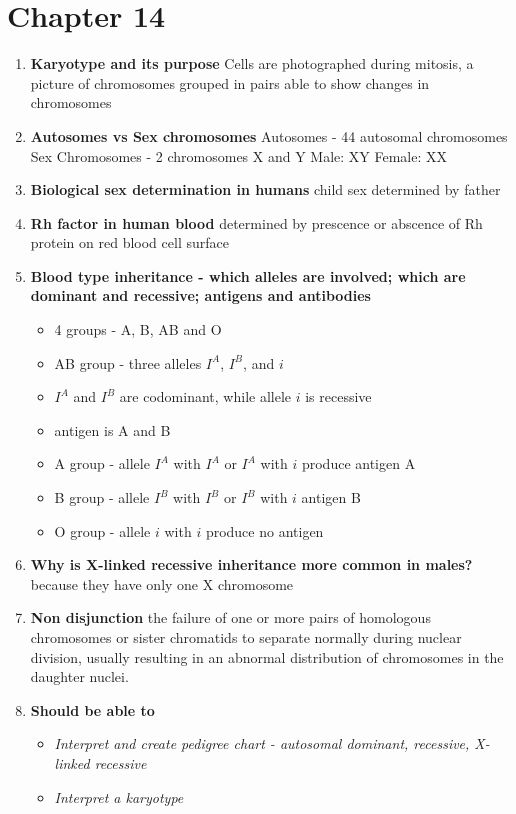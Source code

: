 \documentclass[9pt]{article}
\begin{document}
\section*{Chapter 14}
\begin{enumerate}
  \item {\bf Karyotype and its purpose}  Cells are photographed during mitosis, a picture of chromosomes grouped in pairs able to show changes in chromosomes
  \item {\bf Autosomes vs Sex chromosomes}
  Autosomes - 44 autosomal chromosomes
  Sex Chromosomes - 2 chromosomes X and Y 
  Male: XY
  Female: XX
  \item {\bf Biological sex determination in humans} child sex determined by father 
  \item {\bf Rh factor in human blood}
  determined by prescence or abscence of Rh protein on red blood cell surface
  \item {\bf Blood type inheritance - which alleles are involved; which are dominant and recessive; antigens and antibodies}
  \begin{itemize}
  \item 4 groups - A, B, AB and O
  \item AB group - three alleles $I^A$, $I^B$, and $i$
  \item $I^A$ and $I^B$ are codominant, while allele $i$ is recessive
  \item antigen is A and B
  \item A group - allele $I^A$ with $I^A$ or $I^A$ with $i$ produce antigen A
  \item B group - allele $I^B$ with $I^B$ or $I^B$ with $i$ antigen B
  \item O group - allele $i$ with $i$ produce no antigen
  \end{itemize}
  \item {\bf Why is X-linked recessive inheritance more common in males?}
  because they have only one X chromosome
  \item {\bf Non disjunction}
  the failure of one or more pairs of homologous chromosomes or sister chromatids to separate normally during nuclear division, usually resulting in an abnormal distribution of chromosomes in the daughter nuclei.
  \item {\bf Should be able to}
    \begin{itemize}
      \item {\em Interpret and create pedigree chart  -  autosomal dominant, recessive, X-linked recessive}
      \item {\em Interpret a karyotype}
    \end{itemize}
\end{enumerate}
\end{document}
